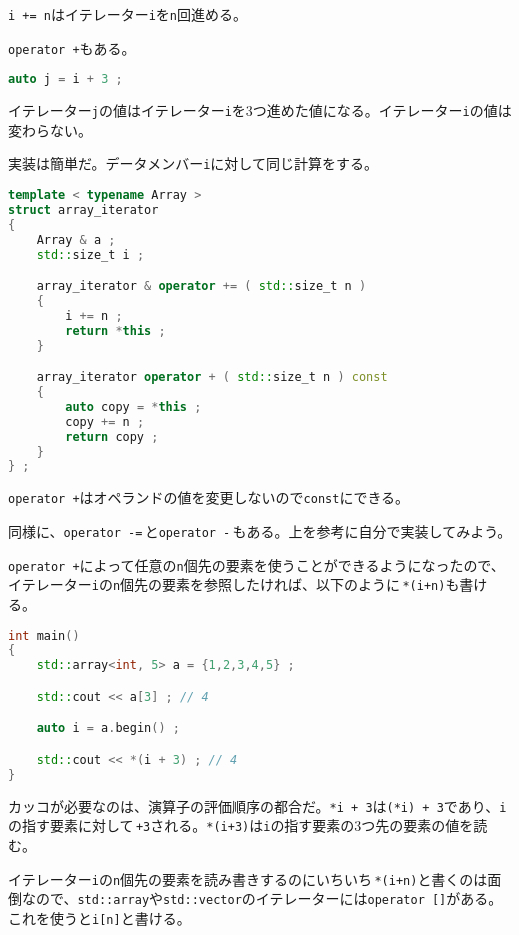 \texttt{i += n}はイテレーター\texttt{i}を\texttt{n}回進める。

\texttt{operator +}もある。

\begin{lstlisting}[language={C++}]
auto j = i + 3 ;
\end{lstlisting}

イテレーター\texttt{j}の値はイテレーター\texttt{i}を3つ進めた値になる。イテレーター\texttt{i}の値は変わらない。

実装は簡単だ。データメンバー\texttt{i}に対して同じ計算をする。

\ifTombow\pagebreak\fi
\begin{lstlisting}[language={C++}]
template < typename Array >
struct array_iterator
{
    Array & a ;
    std::size_t i ;

    array_iterator & operator += ( std::size_t n )
    {
        i += n ;
        return *this ;
    }

    array_iterator operator + ( std::size_t n ) const
    {
        auto copy = *this ;
        copy += n ;
        return copy ;
    }
} ;
\end{lstlisting}

\texttt{operator +}はオペランドの値を変更しないので\texttt{const}にできる。

同様に、\texttt{operator -=}\,と\texttt{operator -}\,もある。上を参考に自分で実装してみよう。

\texttt{operator +}によって任意の\texttt{n}個先の要素を使うことができるようになったので、イテレーター\texttt{i}の\texttt{n}個先の要素を参照したければ、以下のように\,\texttt{*(i+n)}も書ける。

\begin{lstlisting}[language={C++}]
int main()
{
    std::array<int, 5> a = {1,2,3,4,5} ;

    std::cout << a[3] ; // 4

    auto i = a.begin() ;

    std::cout << *(i + 3) ; // 4
}
\end{lstlisting}

カッコが必要なのは、演算子の評価順序の都合だ。\texttt{*i + 3}は\texttt{(*i) + 3}であり、\texttt{i}の指す要素に対して\,\texttt{+3}される。\texttt{*(i+3)}は\texttt{i}の指す要素の3つ先の要素の値を読む。

イテレーター\texttt{i}の\texttt{n}個先の要素を読み書きするのにいちいち\,\texttt{*(i+n)}と書くのは面倒なので、\texttt{std::array}や\texttt{std::vector}のイテレーターには\texttt{operator []}がある。これを使うと\texttt{i[n]}と書ける。

